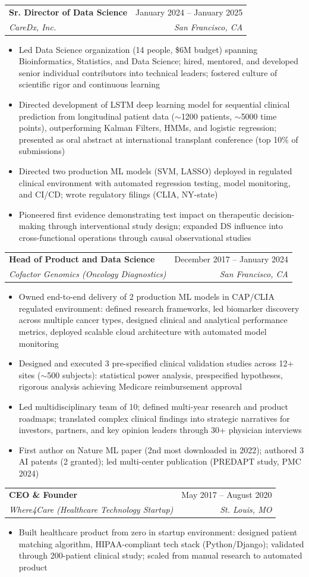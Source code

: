 \documentclass[letterpaper,11pt]{article}
\makeatletter
\newcommand{\resumeItem}[1]{
  \item\small{
    {#1 \vspace{-2pt}}
  }
}
\newcommand{\resumeSubheading}[4]{
  \vspace{-2pt}\item
    \begin{tabular*}{0.97\textwidth}[t]{l@{\extracolsep{\fill}}r}
      \textbf{#1} & #2 \\
      \textit{\small#3} & \textit{\small #4} \\
    \end{tabular*}\vspace{-7pt}
}
\newcommand{\resumeItemListStart}{\begin{itemize}}
\newcommand{\resumeItemListEnd}{\end{itemize}\vspace{-5pt}}
\makeatother
\begin{document}
    \resumeSubheading
      {Sr. Director of Data Science}{January 2024 -- January 2025}
      {CareDx, Inc.}{San Francisco, CA}
      \resumeItemListStart
        \resumeItem{Led Data Science organization (14 people, \$6M budget) spanning Bioinformatics, Statistics, and Data Science; hired, mentored, and developed senior individual contributors into technical leaders; fostered culture of scientific rigor and continuous learning}
        \resumeItem{Directed development of LSTM deep learning model for sequential clinical prediction from longitudinal patient data ($\sim$1200 patients, $\sim$5000 time points), outperforming Kalman Filters, HMMs, and logistic regression; presented as oral abstract at international transplant conference (top 10\% of submissions)}
        \resumeItem{Directed two production ML models (SVM, LASSO) deployed in regulated clinical environment with automated regression testing, model monitoring, and CI/CD; wrote regulatory filings (CLIA, NY-state)}
        \resumeItem{Pioneered first evidence demonstrating test impact on therapeutic decision-making through interventional study design; expanded DS influence into cross-functional operations through causal observational studies}
      \resumeItemListEnd

    \resumeSubheading
      {Head of Product and Data Science}{December 2017 -- January 2024}
      {Cofactor Genomics (Oncology Diagnostics)}{San Francisco, CA}
      \resumeItemListStart
        \resumeItem{Owned end-to-end delivery of 2 production ML models in CAP/CLIA regulated environment: defined research frameworks, led biomarker discovery across multiple cancer types, designed clinical and analytical performance metrics, deployed scalable cloud architecture with automated model monitoring}
        \resumeItem{Designed and executed 3 pre-specified clinical validation studies across 12+ sites ($\sim$500 subjects): statistical power analysis, prespecified hypotheses, rigorous analysis achieving Medicare reimbursement approval}
        \resumeItem{Led multidisciplinary team of 10; defined multi-year research and product roadmaps; translated complex clinical findings into strategic narratives for investors, partners, and key opinion leaders through 30+ physician interviews}
        \resumeItem{First author on Nature ML paper (2nd most downloaded in 2022); authored 3 AI patents (2 granted); led multi-center publication (PREDAPT study, PMC 2024)}
      \resumeItemListEnd

    \resumeSubheading
      {CEO \& Founder}{May 2017 -- August 2020}
      {Where4Care (Healthcare Technology Startup)}{St. Louis, MO}
      \resumeItemListStart
        \resumeItem{Built healthcare product from zero in startup environment: designed patient matching algorithm, HIPAA-compliant tech stack (Python/Django); validated through 200-patient clinical study; scaled from manual research to automated product}
      \resumeItemListEnd
\end{document}
